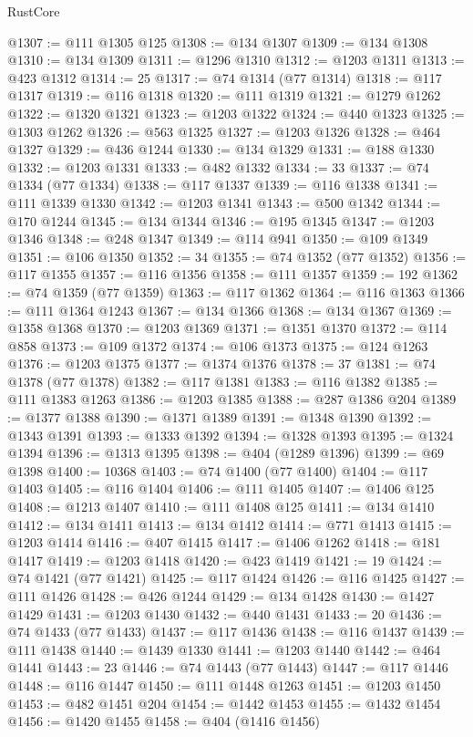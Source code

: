 \begin{lexlean}{RustCore}
\begin{coremodule}
@1307 := @111 @1305 @125
@1308 := @134 @1307
@1309 := @134 @1308
@1310 := @134 @1309
@1311 := @1296 @1310
@1312 := @1203 @1311
@1313 := @423 @1312
@1314 := 25
@1317 := @74 @1314 (@77 @1314)
@1318 := @117 @1317
@1319 := @116 @1318
@1320 := @111 @1319
@1321 := @1279 @1262
@1322 := @1320 @1321
@1323 := @1203 @1322
@1324 := @440 @1323
@1325 := @1303 @1262
@1326 := @563 @1325
@1327 := @1203 @1326
@1328 := @464 @1327
@1329 := @436 @1244
@1330 := @134 @1329
@1331 := @188 @1330
@1332 := @1203 @1331
@1333 := @482 @1332
@1334 := 33
@1337 := @74 @1334 (@77 @1334)
@1338 := @117 @1337
@1339 := @116 @1338
@1341 := @111 @1339 @1330
@1342 := @1203 @1341
@1343 := @500 @1342
@1344 := @170 @1244
@1345 := @134 @1344
@1346 := @195 @1345
@1347 := @1203 @1346
@1348 := @248 @1347
@1349 := @114 @941
@1350 := @109 @1349
@1351 := @106 @1350
@1352 := 34
@1355 := @74 @1352 (@77 @1352)
@1356 := @117 @1355
@1357 := @116 @1356
@1358 := @111 @1357
@1359 := 192
@1362 := @74 @1359 (@77 @1359)
@1363 := @117 @1362
@1364 := @116 @1363
@1366 := @111 @1364 @1243
@1367 := @134 @1366
@1368 := @134 @1367
@1369 := @1358 @1368
@1370 := @1203 @1369
@1371 := @1351 @1370
@1372 := @114 @858
@1373 := @109 @1372
@1374 := @106 @1373
@1375 := @124 @1263
@1376 := @1203 @1375
@1377 := @1374 @1376
@1378 := 37
@1381 := @74 @1378 (@77 @1378)
@1382 := @117 @1381
@1383 := @116 @1382
@1385 := @111 @1383 @1263
@1386 := @1203 @1385
@1388 := @287 @1386 @204
@1389 := @1377 @1388
@1390 := @1371 @1389
@1391 := @1348 @1390
@1392 := @1343 @1391
@1393 := @1333 @1392
@1394 := @1328 @1393
@1395 := @1324 @1394
@1396 := @1313 @1395
@1398 := @404 (@1289 @1396)
@1399 := @69 @1398
@1400 := 10368
@1403 := @74 @1400 (@77 @1400)
@1404 := @117 @1403
@1405 := @116 @1404
@1406 := @111 @1405
@1407 := @1406 @125
@1408 := @1213 @1407
@1410 := @111 @1408 @125
@1411 := @134 @1410
@1412 := @134 @1411
@1413 := @134 @1412
@1414 := @771 @1413
@1415 := @1203 @1414
@1416 := @407 @1415
@1417 := @1406 @1262
@1418 := @181 @1417
@1419 := @1203 @1418
@1420 := @423 @1419
@1421 := 19
@1424 := @74 @1421 (@77 @1421)
@1425 := @117 @1424
@1426 := @116 @1425
@1427 := @111 @1426
@1428 := @426 @1244
@1429 := @134 @1428
@1430 := @1427 @1429
@1431 := @1203 @1430
@1432 := @440 @1431
@1433 := 20
@1436 := @74 @1433 (@77 @1433)
@1437 := @117 @1436
@1438 := @116 @1437
@1439 := @111 @1438
@1440 := @1439 @1330
@1441 := @1203 @1440
@1442 := @464 @1441
@1443 := 23
@1446 := @74 @1443 (@77 @1443)
@1447 := @117 @1446
@1448 := @116 @1447
@1450 := @111 @1448 @1263
@1451 := @1203 @1450
@1453 := @482 @1451 @204
@1454 := @1442 @1453
@1455 := @1432 @1454
@1456 := @1420 @1455
@1458 := @404 (@1416 @1456)

\end{coremodule}
\end{lexlean}
